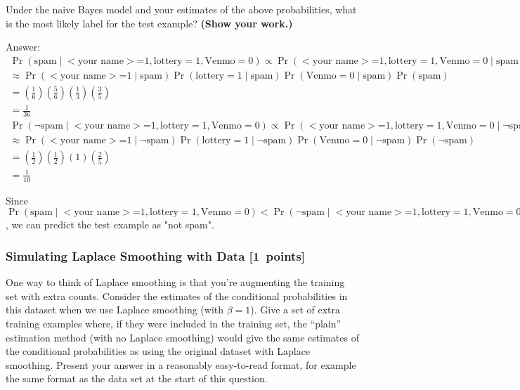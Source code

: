 \documentclass{article}
\newcommand{\blu}[1]{{\textcolor{blu}{#1}}}
\newenvironment{answer}{\par\begingroup\color{gre}Answer: }{\endgroup}
\let\ask\blu
\newcommand\pts[1]{\textcolor{pointscolour}{[#1~points]}}
\begin{document}
    \ask{Under the naive Bayes model and your estimates of the above probabilities, what is the most likely label for the test example? \textbf{(Show your work.)}}
    \begin{answer}\\
        \begin{align*}
            \Pr(\text{spam}\mid \text{$<$your name$>$=1}, \text{lottery}=1, \text{Venmo}=0) \propto \Pr(\text{$<$your name$>$=1}, \text{lottery}=1, \text{Venmo}=0 \mid \text{spam})\Pr(\text{spam})\\
            \approx \Pr(\text{$<$your name$>$=1} \mid \text{spam}) \Pr(\text{lottery}=1 \mid \text{spam}) \Pr(\text{Venmo}=0 \mid \text{spam}) \Pr(\text{spam})\\
            = (\frac{1}{6})(\frac{5}{6})(\frac{1}{3})(\frac{3}{5})\\
            =\frac{1}{36}
        \end{align*}
        \begin{align*}
            \Pr(\neg \text{spam}\mid\text{$<$your name$>$=1}, \text{lottery}=1, \text{Venmo}=0)\propto \Pr(\text{$<$your name$>$=1}, \text{lottery}=1, \text{Venmo}=0 \mid \neg\text{spam})\Pr(\neg\text{spam})\\
            \approx \Pr(\text{$<$your name$>$=1} \mid \neg\text{spam}) \Pr(\text{lottery}=1 \mid \neg\text{spam}) \Pr(\text{Venmo}=0 \mid \neg\text{spam}) \Pr(\neg\text{spam})\\
            = (\frac{1}{2})(\frac{1}{2})(1)(\frac{2}{5})\\
            = \frac{1}{10}
        \end{align*}

        Since $\Pr(\text{spam}\mid \text{$<$your name$>$=1}, \text{lottery}=1, \text{Venmo}=0) <  \Pr(\neg \text{spam}\mid\text{$<$your name$>$=1}, \text{lottery}=1, \text{Venmo}=0)$,
        we can predict the test example as "not spam".
    \end{answer}

    \subsubsection{Simulating Laplace Smoothing with Data \pts{1}}
    \label{laplace.conceptual}

    One way to think of Laplace smoothing is that you're augmenting the training set with extra counts. Consider the estimates of the conditional probabilities in this dataset when we use Laplace smoothing (with $\beta = 1$).
    \ask{Give a set of extra training examples where, if they were included in the training set, the ``plain'' estimation method (with no Laplace smoothing) would give the same estimates of the conditional probabilities as using the original dataset with Laplace smoothing.}
    Present your answer in a reasonably easy-to-read format, for example the same format as the data set at the start of this question.
\end{document}
